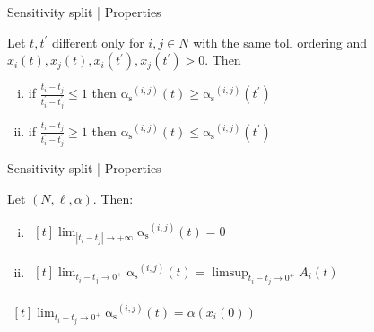 \documentclass[handout]{beamer}
\newcommand{\as}{\mathrm{\alpha_s}}
\begin{document}
\begin{frame}{Sensitivity split | Properties}
	\begin{lemma}[Monotonicity]
		Let $t, t^\prime$ different only for $i, j \in N$ with the same toll ordering and $x_i(t), x_j(t), x_i(t^\prime), x_j(t^\prime) > 0$.
		Then
		\begin{enumerate}[(i)]
			\item if $\frac{t_i - t_j}{t_i^\prime - t_j^\prime} \le 1$ then $\as^{(i, j)}(t) \ge \as^{(i, j)}(t^\prime)$
			\item if $\frac{t_i - t_j}{t_i^\prime - t_j^\prime} \ge 1$ then $\as^{(i, j)}(t) \le \as^{(i, j)}(t^\prime)$
		\end{enumerate}
	\end{lemma}
\end{frame}

\begin{frame}{Sensitivity split | Properties}
	\begin{lemma}
		Let $(N, \ell, \alpha)$.
		Then:
		\begin{enumerate}[(i)]
			\item
			$\begin{aligned}[t]
				\lim_{|t_i - t_j| \rightarrow +\infty}\as^{(i, j)}(t) = 0
			\end{aligned}$
			\item
			$\begin{aligned}[t]
				\lim_{t_i - t_j \rightarrow 0^+} \as^{(i, j)}(t) = \limsup_{t_i - t_j \rightarrow 0^+} A_i(t)
			\end{aligned}$
		\end{enumerate}
	\end{lemma}
	\begin{corollary}
		$\begin{aligned}[t]
			\lim_{t_i - t_j \rightarrow 0^+} \as^{(i, j)}(t) = \alpha(x_i(0))
		\end{aligned}$
	\end{corollary}
\end{frame}
\end{document}
